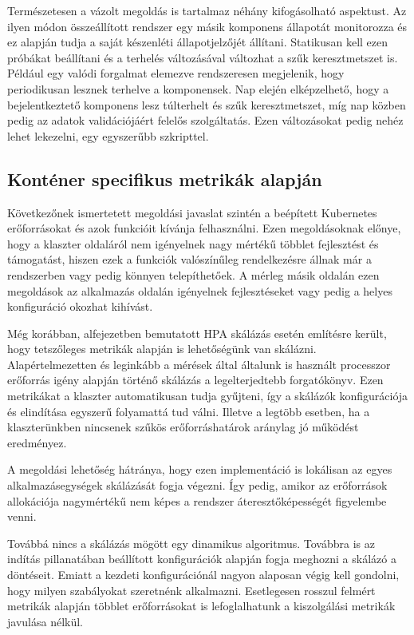 Természetesen a vázolt megoldás is tartalmaz néhány kifogásolható aspektust. 
Az ilyen módon összeállított rendszer egy másik komponens állapotát monitorozza és ez alapján tudja a saját készenléti állapotjelzőjét állítani. 
Statikusan kell ezen próbákat beállítani és a terhelés változásával változhat a szűk keresztmetszet is.
Például egy valódi forgalmat elemezve rendszeresen megjelenik, hogy periodikusan lesznek terhelve a komponensek.
Nap elején elképzelhető, hogy a bejelentkeztető komponens lesz túlterhelt és szűk keresztmetszet, míg nap közben pedig az adatok validációjáért felelős szolgáltatás.
Ezen változásokat pedig nehéz lehet lekezelni, egy egyszerűbb szkripttel.


\subsection{Konténer specifikus metrikák alapján}
\label{subsec:container_metric_scaling}
Következőnek ismertetett megoldási javaslat szintén a beépített Kubernetes erőforrásokat és azok funkcióit kívánja felhasználni.
Ezen megoldásoknak előnye, hogy a klaszter oldaláról nem igényelnek nagy mértékű többlet fejlesztést és támogatást, hiszen ezek a funkciók valószínűleg rendelkezésre állnak már a rendszerben vagy pedig könnyen telepíthetőek.
A mérleg másik oldalán ezen megoldások az alkalmazás oldalán igényelnek fejlesztéseket vagy pedig a helyes konfiguráció okozhat kihívást.

Még korábban,  alfejezetben bemutatott HPA skálázás esetén említésre került, hogy tetszőleges metrikák alapján is lehetőségünk van skálázni.
Alapértelmezetten és leginkább a mérések által általunk is használt processzor erőforrás igény alapján történő skálázás a legelterjedtebb forgatókönyv.
Ezen metrikákat a klaszter automatikusan tudja gyűjteni, így a skálázók konfigurációja és elindítása egyszerű folyamattá tud válni.
Illetve a legtöbb esetben, ha a klaszterünkben nincsenek szűkös erőforráshatárok aránylag jó működést eredményez.

A megoldási lehetőség hátránya, hogy ezen implementáció is lokálisan az egyes alkalmazásegységek skálázását fogja végezni.
Így pedig, amikor az erőforrások allokációja nagymértékű nem képes a rendszer áteresztőképességét figyelembe venni.

Továbbá nincs a skálázás mögött egy dinamikus algoritmus.
Továbbra is az indítás pillanatában beállított konfigurációk alapján fogja meghozni a skálázó a döntéseit.
Emiatt a kezdeti konfigurációnál nagyon alaposan végig kell gondolni, hogy milyen szabályokat szeretnénk alkalmazni.
Esetlegesen rosszul felmért metrikák alapján többlet erőforrásokat is lefoglalhatunk a kiszolgálási metrikák javulása nélkül.

